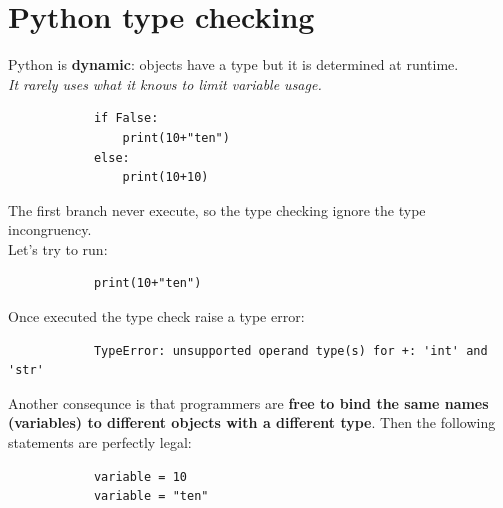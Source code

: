 \documentclass[12pt]{article}
\begin{document}
\section{Python type checking}
		
		Python is \textbf{dynamic}: objects have a type but it is determined at runtime. \\
		\textit{It rarely uses what it knows to limit variable usage.}
		
		\begin{lstlisting}
			if False:
				print(10+"ten") 
			else:
				print(10+10)
		\end{lstlisting}
		
		The first branch never execute, so the type checking ignore the type incongruency.\\
		Let's try to run:
		
		\begin{lstlisting}
			print(10+"ten")
		\end{lstlisting}
		
		Once executed the type check raise a type error:
		
		\begin{lstlisting}
			TypeError: unsupported operand type(s) for +: 'int' and 'str'
		\end{lstlisting}
		
		Another consequnce is that programmers are \textbf{free to bind the same names (variables) to different objects with a different type}. Then the following statements are perfectly legal:
		
		\begin{lstlisting}
			variable = 10
			variable = "ten"
		\end{lstlisting}
		
		
		
		
		
		
	
		
		






		
\end{document}
